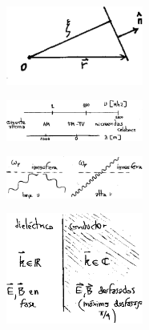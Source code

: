\documentclass[10pt,oneside]{CBFT_book}
\begin{document}
\begin{figure}[htb]
	\begin{center}
	\includegraphics[width=0.4\textwidth]{images/fig_ft1_conduc1.pdf}	 
	\end{center}
	\caption{}
\end{figure} 

\begin{figure}[htb]
	\begin{center}
	\includegraphics[width=0.4\textwidth]{images/fig_ft1_conduc2.pdf}	 
	\end{center}
	\caption{}
\end{figure} 

\begin{figure}[htb]
	\begin{center}
	\includegraphics[width=0.4\textwidth]{images/fig_ft1_conduc3.pdf}	 
	\end{center}
	\caption{}
\end{figure} 

\begin{figure}[htb]
	\begin{center}
	\includegraphics[width=0.4\textwidth]{images/fig_ft1_conduc4.pdf}	 
	\end{center}
	\caption{}
\end{figure} 
\end{document}
